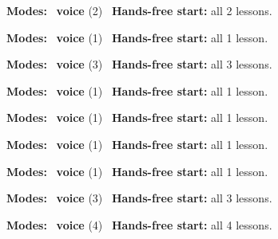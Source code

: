 \expandafter\def\csname hlchaptermodality141\endcsname{%
  {\small\noindent
    \textbf{Modes:} \hlvoicesign{}~\textbf{voice} (2)\quad
    \hlvoicesign{}~\textbf{Hands-free start:} all 2 lessons.%
    \par}\medskip
}

\expandafter\def\csname hlchaptermodality142\endcsname{%
  {\small\noindent
    \textbf{Modes:} \hlvoicesign{}~\textbf{voice} (1)\quad
    \hlvoicesign{}~\textbf{Hands-free start:} all 1 lesson.%
    \par}\medskip
}

\expandafter\def\csname hlchaptermodality143\endcsname{%
  {\small\noindent
    \textbf{Modes:} \hlvoicesign{}~\textbf{voice} (3)\quad
    \hlvoicesign{}~\textbf{Hands-free start:} all 3 lessons.%
    \par}\medskip
}

\expandafter\def\csname hlchaptermodality144\endcsname{%
  {\small\noindent
    \textbf{Modes:} \hlvoicesign{}~\textbf{voice} (1)\quad
    \hlvoicesign{}~\textbf{Hands-free start:} all 1 lesson.%
    \par}\medskip
}

\expandafter\def\csname hlchaptermodality145\endcsname{%
  {\small\noindent
    \textbf{Modes:} \hlvoicesign{}~\textbf{voice} (1)\quad
    \hlvoicesign{}~\textbf{Hands-free start:} all 1 lesson.%
    \par}\medskip
}

\expandafter\def\csname hlchaptermodality146\endcsname{%
  {\small\noindent
    \textbf{Modes:} \hlvoicesign{}~\textbf{voice} (1)\quad
    \hlvoicesign{}~\textbf{Hands-free start:} all 1 lesson.%
    \par}\medskip
}

\expandafter\def\csname hlchaptermodality147\endcsname{%
  {\small\noindent
    \textbf{Modes:} \hlvoicesign{}~\textbf{voice} (1)\quad
    \hlvoicesign{}~\textbf{Hands-free start:} all 1 lesson.%
    \par}\medskip
}

\expandafter\def\csname hlchaptermodality148\endcsname{%
  {\small\noindent
    \textbf{Modes:} \hlvoicesign{}~\textbf{voice} (3)\quad
    \hlvoicesign{}~\textbf{Hands-free start:} all 3 lessons.%
    \par}\medskip
}

\expandafter\def\csname hlchaptermodality149\endcsname{%
  {\small\noindent
    \textbf{Modes:} \hlvoicesign{}~\textbf{voice} (4)\quad
    \hlvoicesign{}~\textbf{Hands-free start:} all 4 lessons.%
    \par}\medskip
}

